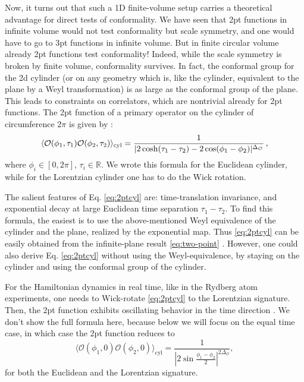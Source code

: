 \documentclass[a4paper,11pt]{article}
\theoremstyle{remark}
\theoremstyle{theorem}
\begin{document}
Now, it turns out that such a 1D finite-volume setup carries a theoretical
advantage for direct tests of conformality. We have seen that 2pt functions in
infinite volume would not test conformality but scale symmetry, and one would
have to go to 3pt functions in infinite volume. But in finite circular volume
already 2pt functions test conformality! Indeed, while the scale symmetry is
broken by finite volume, conformality survives. In fact, the conformal group for
the 2d cylinder (or on any geometry which is, like the cylinder, equivalent to
the plane by a Weyl transformation) is as large as the conformal group of the
plane. This leads to constraints on correlators, which are nontrivial already
for 2pt functions. The 2pt function of a primary operator on the cylinder of
circumference $2 \pi$ is given by {\cite{Luscher:1974ez}}:
\begin{equation}
	\label{eq:2ptcyl} \langle \mathcal{O}(\phi_1, \tau_1)\mathcal{O}(\phi_2,
	\tau_2) \rangle_{\text{cyl}} = \frac{1}{|2 \cosh
		(\tau_1 - \tau_2) - 2 \cos (\phi_1 - \phi_2) |^{\Delta_{\mathcal{O}}}}
	\hspace{0.17em},
\end{equation}
where $\phi_i \in [0, 2 \pi]$, $\tau_i \in \mathbb{R}$. We wrote this formula
for the Euclidean cylinder, while for the Lorentzian cylinder one has to do
the Wick rotation.

The salient features of Eq. \eqref{eq:2ptcyl} are: time-translation
invariance, and exponential decay at large Euclidean time separation $\tau_1 -
\tau_2$. To find this formula, the easiest is to use the above-mentioned Weyl
equivalence of the cylinder and the plane, realized by the exponential map.
Thus \eqref{eq:2ptcyl} can be easily obtained from the infinite-plane result
\eqref{eq:two-point} {\cite{DiFrancesco:1997nk}}. However, one
could also derive Eq. \eqref{eq:2ptcyl} without using the
Weyl-equivalence, by staying on the cylinder and using the conformal group of
the cylinder.

For the Hamiltonian dynamics in real time, like in the Rydberg atom
experiments, one needs to Wick-rotate \eqref{eq:2ptcyl} to the Lorentzian
signature. Then, the 2pt function exhibits oscillating behavior in the time
direction {\cite{Luscher:1974ez}}. We don't show the full formula here,
because below we will focus on the equal time case, in which case the 2pt
function reduces to
\begin{equation}
	\label{eq:2ptcylequal} \langle \mathcal{O}(\phi_1, 0)\mathcal{O}(\phi_2, 0)
	\rangle_{\text{cyl}} = \frac{1}{|2 \sin \frac{\phi_1 -
			\phi_2}{2} |^{2 \Delta_{\mathcal{O}}}},
\end{equation}
for both the Euclidean and the Lorentzian signature.
\end{document}
